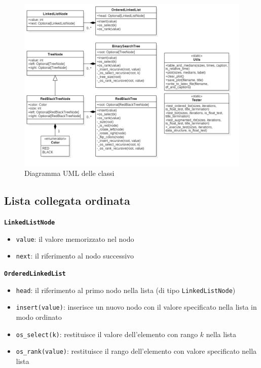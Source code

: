 \documentclass[onecolumn]{article}
\begin{document}
\begin{figure}[h!]
  \includegraphics[width=\linewidth]{classi.png}
  \caption{Diagramma UML delle classi}
  \label{fig:classi}
\end{figure}

\subsection{Lista collegata ordinata}
\texttt{\textbf{LinkedListNode}}
\begin{itemize}
\setlength\itemsep{0em}
    \item \verb|value|: il valore memorizzato nel nodo
    \item \verb|next|: il riferimento al nodo successivo
\end{itemize}

{\setlength{\parindent}{0em} \texttt{\textbf{OrderedLinkedList}}}
\begin{itemize}
\setlength\itemsep{0em}
    \item \verb|head|: il riferimento al primo nodo nella lista (di tipo \texttt{LinkedListNode})
    \item \verb|insert(value)|: inserisce un nuovo nodo con il valore specificato nella lista in modo ordinato
    \item \verb|os_select(k)|: restituisce il valore dell'elemento con rango $k$ nella lista
    \item \verb|os_rank(value)|: restituisce il rango dell'elemento con valore specificato nella lista
\end{itemize}
\end{document}
